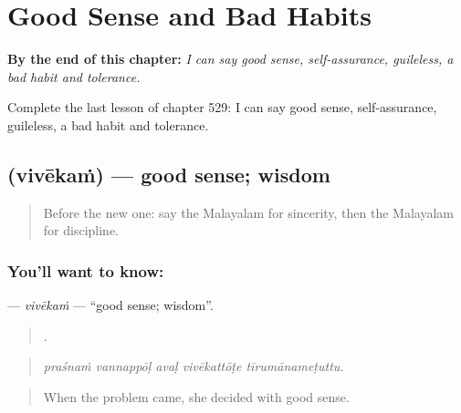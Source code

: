 
\chapter{Good Sense and Bad Habits}
\label{ch:ml-good-sense-and-bad-habits}

\begin{chapteropening}
\textbf{By the end of this chapter:} \emph{I can say good sense, self-assurance, guileless, a bad habit and tolerance.}

Complete the last lesson of chapter 529: I can say good sense, self-assurance, guileless, a bad habit and tolerance.
\end{chapteropening}

\section[\texorpdfstring{\ml{വിവേകം} (vivēkaṁ)}{വിവേകം (vivēkaṁ)}]{ (vivēkaṁ) — good sense; wisdom}

\label{lesson:ML-C529-vivekam}



\begin{quote}
Before the new one: say the Malayalam for sincerity, then the Malayalam for discipline.
\end{quote}

\subsection*{You'll want to know: }
\textbf{} — \emph{vivēkaṁ} — \textquotedblleft{}good sense; wisdom\textquotedblright{}.

\begin{quote}
    .
\end{quote}

\begin{quote}
\emph{praśnaṁ vannappōḷ avaḷ vivēkattōṭe tīrumānameṭuttu.}
\end{quote}

\begin{quote}
When the problem came, she decided with good sense.
\end{quote}

